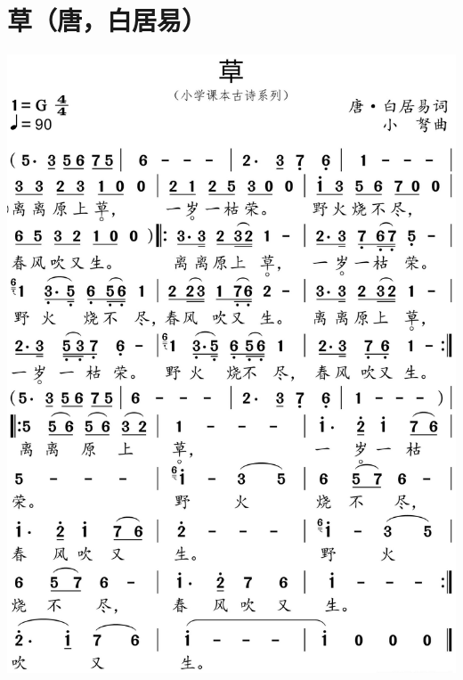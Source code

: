 \documentclass[cn,pad,chinesefont=nofont]{elegantbook}
\begin{document}
\section{草（唐，白居易）}
    \includegraphics[width=\textwidth]{dongxiao/20200627-古诗-草.jpg}   
\end{document}
